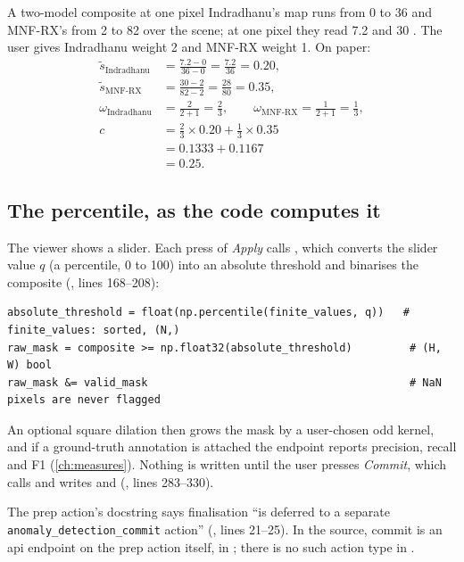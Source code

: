 \begin{worked}[label={we:material:composite}]{A two-model composite at one pixel}
Indradhanu's map runs from 0 to 36 and MNF-RX's from 2 to 82 over the scene; at one pixel they read 7.2 and
30 \tagA. The user gives Indradhanu weight 2 and MNF-RX weight 1. On paper:
\begin{align*}
\tilde{s}_{\text{Indradhanu}} &= \frac{7.2-0}{36-0} = \frac{7.2}{36} = 0.20,\\
\tilde{s}_{\text{MNF-RX}} &= \frac{30-2}{82-2} = \frac{28}{80} = 0.35,\\
\omega_{\text{Indradhanu}} &= \frac{2}{2+1} = \frac23, \qquad \omega_{\text{MNF-RX}} = \frac{1}{2+1} = \frac13,\\
c &= \tfrac23\times0.20+\tfrac13\times0.35\\
&= 0.1333+0.1167\\
&= 0.25.
\end{align*}
\end{worked}

\subsection{The percentile, as the code computes it}

The viewer shows a slider. Each press of \emph{Apply} calls
, which converts the slider value $q$ (a percentile,
0 to 100) into an absolute threshold and binarises the composite
(, lines 168--208):
\begin{lstlisting}
absolute_threshold = float(np.percentile(finite_values, q))   # finite_values: sorted, (N,)
raw_mask = composite >= np.float32(absolute_threshold)         # (H, W) bool
raw_mask &= valid_mask                                         # NaN pixels are never flagged
\end{lstlisting}
An optional square dilation then grows the mask by a user-chosen odd kernel, and if a ground-truth annotation
is attached the endpoint reports precision, recall and F1 (\cref{ch:measures}). Nothing is written until the
user presses \emph{Commit}, which calls  and writes
 and  (, lines
283--330).

\begin{sourcenote}
The prep action's docstring says finalisation ``is deferred to a separate \texttt{anomaly\_detection\_commit}
action'' (, lines 21--25). In the source, commit is an api endpoint on the
prep action itself,  in ; there
is no such action type in .
\end{sourcenote}

